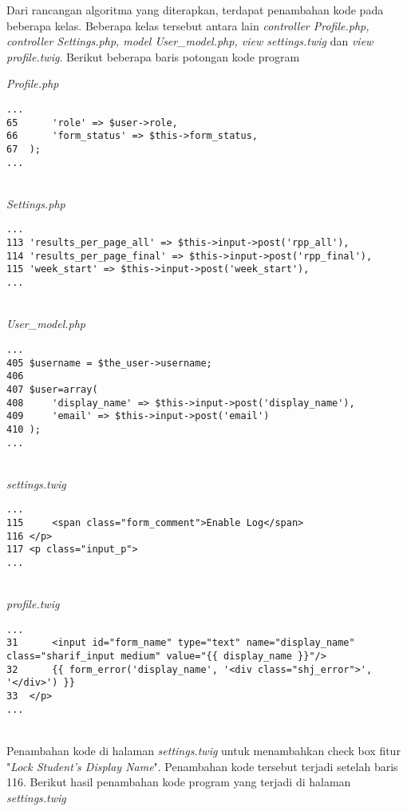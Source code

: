 Dari rancangan algoritma yang diterapkan, terdapat penambahan kode pada beberapa kelas. Beberapa kelas tersebut antara lain \textit{controller Profile.php, controller Settings.php, model User\_model.php, view settings.twig} dan \textit{view profile.twig}.
Berikut beberapa baris potongan kode program

\textit{Profile.php}
\begin{lstlisting}[basicstyle=\ttfamily, frame=single,
columns=fullflexible, keepspaces=true, breaklines=true]
...
65		'role' => $user->role,
66		'form_status' => $this->form_status,
67	);
...
\end{lstlisting}
~\\
\textit{Settings.php}
\begin{lstlisting}[basicstyle=\ttfamily, frame=single,
columns=fullflexible, keepspaces=true, breaklines=true]
...
113	'results_per_page_all' => $this->input->post('rpp_all'),
114	'results_per_page_final' => $this->input->post('rpp_final'),
115	'week_start' => $this->input->post('week_start'),
...
\end{lstlisting}
~\\
\textit{User\_model.php}
\begin{lstlisting}[basicstyle=\ttfamily, frame=single,
columns=fullflexible, keepspaces=true, breaklines=true]
...
405	$username = $the_user->username;
406
407	$user=array(
408		'display_name' => $this->input->post('display_name'),
409		'email' => $this->input->post('email')
410	);
...
\end{lstlisting}
~\\
\textit{settings.twig}
\begin{lstlisting}[basicstyle=\ttfamily, frame=single,
columns=fullflexible, keepspaces=true, breaklines=true]
...
115		<span class="form_comment">Enable Log</span>
116	</p>
117	<p class="input_p">
...
\end{lstlisting}
~\\
\textit{profile.twig}
\begin{lstlisting}[basicstyle=\ttfamily, frame=single,
columns=fullflexible, keepspaces=true, breaklines=true]
...
31		<input id="form_name" type="text" name="display_name" class="sharif_input medium" value="{{ display_name }}"/>
32		{{ form_error('display_name', '<div class="shj_error">', '</div>') }}
33	</p>
...
\end{lstlisting}
~\\
Penambahan kode di halaman \textit{settings.twig} untuk menambahkan check box fitur "\textit{Lock Student's Display Name}". Penambahan kode tersebut terjadi setelah baris 116. Berikut hasil penambahan kode program yang terjadi di halaman \textit{settings.twig}

